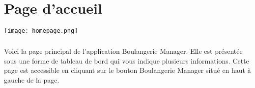 \chapter{Page d'accueil}

\texttt{[image: homepage.png]}

\paragraph{}
Voici la page principal de l'application Boulangerie Manager. Elle est présentée sous une forme de tableau de bord qui vous indique plusieurs informations. Cette page est accessible en cliquant sur le bouton Boulangerie Manager situé en haut à gauche de la page.


